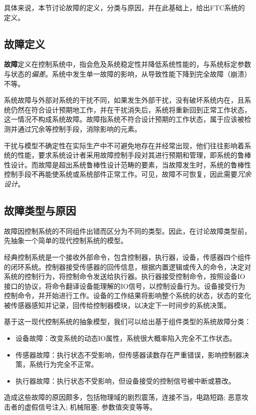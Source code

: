 \documentclass[UTF8]{article}
\begin{document}
具体来说，本节讨论故障的定义，分类与原因，并在此基础上，给出FTC系统的定义。
\subsection{故障定义}
\textbf{故障}定义在控制系统中，指会危及系统稳定性并降低系统性能的，与系统标定参数与状态的\emph{偏差}。系统中发生单一故障的影响，从导致性能下降到完全故障（崩溃）不等。

系统故障与外部对系统的干扰不同，如果发生外部干扰，没有破坏系统内在，且系统仍然在符合设计预期地工作，并在干扰消失后，系统将重新回到正常工作状态，这一情况不构成系统故障。故障指系统不符合设计预期的工作状态，属于应该被检测并通过冗余等控制手段，消除影响的元素。

干扰与模型不确定性在实际生产中不可避免地存在并经常出现，他们往往影响着系统的性能，要求系统设计者采用故障控制手段对其进行预期和管理，即系统的鲁棒性设计。而故障是超出系统鲁棒性设计范畴的要素，当故障发生时，系统的鲁棒性控制手段不再能使系统或系统部件正常工作。可见，故障不可恢复，因此需要\emph{冗余设计}。


\subsection{故障类型与原因}
故障因控制系统的不同组件出错而区分为不同的类型。因此，在讨论故障类型前，先抽象一个简单的现代控制系统的模型。

经典控制系统是一个接收外部命令，包含控制器，执行器，设备，传感器四个组件的闭环系统。控制器接受传感器的回传信息，根据内置逻辑或传入的命令，决定对系统的控制行为，将控制命令发送给执行器。执行器接受控制命令，按照设备IO接口的协议，将命令翻译设备能理解的IO信号，以控制设备行为。设备接受行为控制命令，并开始进行工作。设备的工作结果将影响整个系统的状态，状态的变化被传感器感知并记录，回传给控制器模块，以决定下一时间步的系统决策。

基于这一现代控制系统的抽象模型，我们可以给出基于组件类型的系统故障分类：
\begin{itemize}
  \item 设备故障：改变系统的动态IO属性，系统很大概率陷入完全不工作状态。
  \item 传感器故障：执行状态不受影响，但传感器读数存在严重错误，影响控制器决策，系统行为完全不正常。
  \item 执行器故障：执行状态不受影响，但设备接受的控制信号被中断或篡改。
  
\end{itemize}
造成这些故障的原因颇多，包括物理域的剧烈震荡，连接不当，电路短路; 恶意攻击者的虚假信号注入; 机械阻塞; 参数值突变等等。
\end{document}
